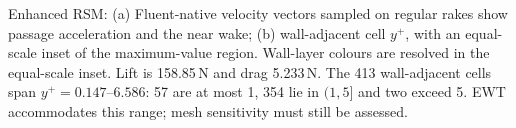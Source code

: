 \caption{Enhanced RSM: (a) Fluent-native velocity vectors sampled on regular rakes show passage acceleration and the near wake; (b) wall-adjacent cell $y^+$, with an equal-scale inset of the maximum-value region. Wall-layer colours are resolved in the equal-scale inset. Lift is 158.85\,N and drag 5.233\,N. The 413 wall-adjacent cells span $y^+=0.147$--$6.586$: 57 are at most 1, 354 lie in $(1,5]$ and two exceed 5. EWT accommodates this range; mesh sensitivity must still be assessed.}
